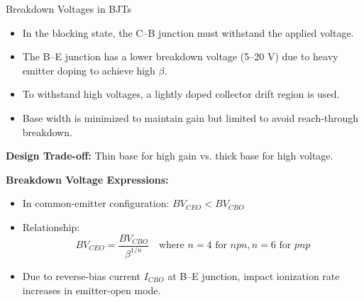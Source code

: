 \begin{frame}{Breakdown Voltages in BJTs}
\begin{itemize}
  \item In the blocking state, the C--B junction must withstand the applied voltage.
  \item The B--E junction has a lower breakdown voltage (5–20 V) due to heavy emitter doping to achieve high $\beta$.
  \item To withstand high voltages, a lightly doped collector drift region is used.
  \item Base width is minimized to maintain gain but limited to avoid reach-through breakdown.
\end{itemize}
\textbf{Design Trade-off:} Thin base for high gain vs. thick base for high voltage.

\textbf{Breakdown Voltage Expressions:}
\begin{itemize}
  \item In common-emitter configuration: $BV_{CEO} < BV_{CBO}$
  \item Relationship:
  \[
  BV_{CEO} = \frac{BV_{CBO}}{\beta^{1/n}} \quad \text{where } n = 4 \text{ for } npn, n = 6 \text{ for } pnp
  \]
  \item Due to reverse-bias current $I_{CBO}$ at B--E junction, impact ionization rate increases in emitter-open mode.
\end{itemize}
\end{frame}


